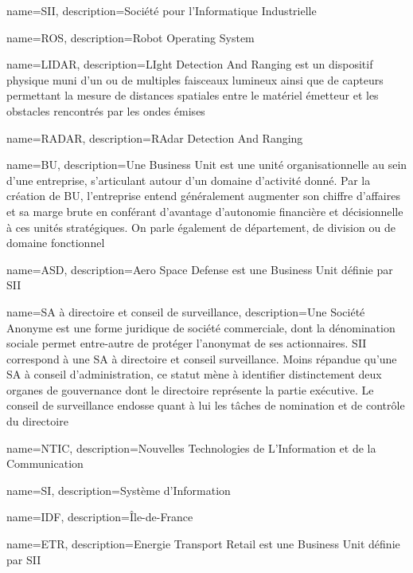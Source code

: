 \makeglossary

{
  name={SII},
    description={Société pour l'Informatique Industrielle}
}

{
  name={ROS},
    description={Robot Operating System}
}

{
  name={LIDAR},
    description={LIght Detection And Ranging est un dispositif physique muni d'un ou de multiples faisceaux lumineux ainsi que de capteurs permettant la mesure de distances spatiales entre le matériel émetteur et les obstacles rencontrés par les ondes émises}
}

{
  name={RADAR},
    description={RAdar Detection And Ranging}
}

{
  name={BU},
    description={Une Business Unit est une unité organisationnelle au sein d'une entreprise, s'articulant autour d'un domaine d'activité donné. Par la création de BU, 
    l'entreprise entend généralement augmenter son chiffre d'affaires et sa marge brute en conférant 
    d'avantage d'autonomie financière et décisionnelle à ces unités stratégiques. On parle également de département, de division ou de domaine fonctionnel}
}

{
  name={ASD},
    description={Aero Space Defense est une Business Unit définie par SII}
}

{
  name={SA \`{a} directoire et conseil de surveillance},
    description={Une Société Anonyme est une forme juridique de société commerciale, dont la dénomination sociale permet entre-autre de protéger l'anonymat de ses actionnaires. 
    SII correspond à une SA à directoire et conseil surveillance.
    Moins répandue qu'une SA à conseil d'administration\cite{Bib_SA_wiki}, ce statut mène à identifier distinctement deux organes de gouvernance dont le directoire représente la partie exécutive. 
    Le conseil de surveillance endosse quant à lui les tâches de nomination et de contrôle du directoire}
}

{
  name={NTIC},
    description={Nouvelles Technologies de L'Information et de la Communication}
}

{
  name={SI},
    description={Système d'Information}
}

{
  name={IDF},
    description={\^{I}le-de-France}
}

{
  name={ETR},
    description={Energie Transport Retail est une Business Unit définie par SII}
}

